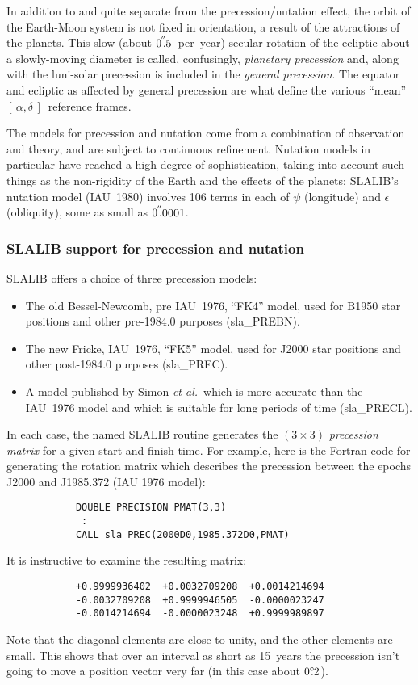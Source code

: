 \documentclass[11pt,twoside]{article}
\newcommand{\radec}     {$[\,\alpha,\delta\,]$}
\newcommand{\degree}[2] {$#1^{\circ}
                        \hspace{-0.37em}.\hspace{0.02em}#2$}
\newcommand{\arcsec}[2] {\arcseci{#1}$\hspace{-0.4em}.#2$}
\newcommand{\arcsec}[2] {
      {$#1\hspace{-0.05em}^{'\hspace{-0.1em}'}\hspace{-0.4em}.#2$}
   }
\newcommand{\arcseci}[1] {$#1\hspace{-0.05em}$\raisebox{-0.5ex}
                         {$^{'\hspace{-0.1em}'}$}}
\renewcommand{\arcseci}[1] {$#1\hspace{-0.05em}^{'\hspace{-0.1em}'}$}
\begin{document}
In addition to and quite separate
from the precession/nutation effect, the orbit of the Earth-Moon system
is not fixed in orientation, a result of the attractions of the
planets.  This slow (about \arcsec{0}{5}~per~year)
secular rotation of the ecliptic about a slowly-moving diameter is called,
confusingly, {\it planetary
precession}\/ and, along with the luni-solar precession is
included in the {\it general precession}.  The equator and
ecliptic as affected by general precession
are what define the various ``mean'' \radec\ reference frames.

The models for precession and nutation come from a combination
of observation and theory, and are subject to continuous
refinement.  Nutation models in particular have reached a high
degree of sophistication, taking into account such things as
the non-rigidity of the Earth and the effects of
the planets; SLALIB's nutation
model (IAU~1980) involves 106 terms in each of $\psi$ (longitude)
and $\epsilon$ (obliquity), some as small as \arcsec{0}{0001}.

\subsubsection{SLALIB support for precession and nutation}
SLALIB offers a choice of three precession models:
\begin{itemize}
\item The old Bessel-Newcomb, pre IAU~1976, ``FK4'' model, used for B1950
      star positions and other pre-1984.0 purposes
(sla\_PREBN).
\item The new Fricke, IAU~1976, ``FK5'' model, used for J2000 star
      positions and other post-1984.0 purposes
(sla\_PREC).
\item A model published by Simon {\it et al.}\ which is more accurate than
      the IAU~1976 model and which is suitable for long
      periods of time
(sla\_PRECL).
\end{itemize}
In each case, the named SLALIB routine generates the $(3\times3)$
{\it precession
matrix}\/ for a given start and finish time.  For example,
here is the Fortran code for generating the rotation
matrix which describes the precession between the epochs
J2000 and J1985.372 (IAU 1976 model):
\goodbreak
\begin{verbatim}
            DOUBLE PRECISION PMAT(3,3)
             :
            CALL sla_PREC(2000D0,1985.372D0,PMAT)
\end{verbatim}
\goodbreak
It is instructive to examine the resulting matrix:
\goodbreak
\begin{verbatim}
            +0.9999936402  +0.0032709208  +0.0014214694
            -0.0032709208  +0.9999946505  -0.0000023247
            -0.0014214694  -0.0000023248  +0.9999989897
\end{verbatim}
\goodbreak
Note that the diagonal elements are close to unity, and the
other elements are small.  This shows that over an interval as
short as 15~years the precession isn't going to move a
position vector very far (in this case about \degree{0}{2}).
\end{document}

